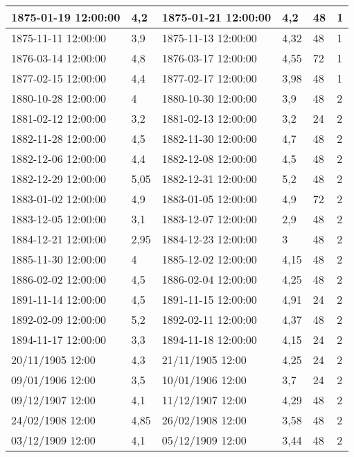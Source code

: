 \begin{longtable}{|p{3cm}|p{2.1cm}|p{3cm}|p{2cm}|l|l|}
        1875-01-19 12:00:00 & 4,2 & 1875-01-21 12:00:00 & 4,2 & 48 & 1 \\ \hline
        1875-11-11 12:00:00 & 3,9 & 1875-11-13 12:00:00 & 4,32 & 48 & 1 \\ \hline
        1876-03-14 12:00:00 & 4,8 & 1876-03-17 12:00:00 & 4,55 & 72 & 1 \\ \hline
        1877-02-15 12:00:00 & 4,4 & 1877-02-17 12:00:00 & 3,98 & 48 & 1 \\ \hline
        1880-10-28 12:00:00 & 4 & 1880-10-30 12:00:00 & 3,9 & 48 & 2 \\ \hline
        1881-02-12 12:00:00 & 3,2 & 1881-02-13 12:00:00 & 3,2 & 24 & 2 \\ \hline
        1882-11-28 12:00:00 & 4,5 & 1882-11-30 12:00:00 & 4,7 & 48 & 2 \\ \hline
        1882-12-06 12:00:00 & 4,4 & 1882-12-08 12:00:00 & 4,5 & 48 & 2 \\ \hline
        1882-12-29 12:00:00 & 5,05 & 1882-12-31 12:00:00 & 5,2 & 48 & 2 \\ \hline
        1883-01-02 12:00:00 & 4,9 & 1883-01-05 12:00:00 & 4,9 & 72 & 2 \\ \hline
        1883-12-05 12:00:00 & 3,1 & 1883-12-07 12:00:00 & 2,9 & 48 & 2 \\ \hline
        1884-12-21 12:00:00 & 2,95 & 1884-12-23 12:00:00 & 3 & 48 & 2 \\ \hline
        1885-11-30 12:00:00 & 4 & 1885-12-02 12:00:00 & 4,15 & 48 & 2 \\ \hline
        1886-02-02 12:00:00 & 4,5 & 1886-02-04 12:00:00 & 4,25 & 48 & 2 \\ \hline
        1891-11-14 12:00:00 & 4,5 & 1891-11-15 12:00:00 & 4,91 & 24 & 2 \\ \hline
        1892-02-09 12:00:00 & 5,2 & 1892-02-11 12:00:00 & 4,37 & 48 & 2 \\ \hline
        1894-11-17 12:00:00 & 3,3 & 1894-11-18 12:00:00 & 4,15 & 24 & 2 \\ \hline
        20/11/1905 12:00 & 4,3 & 21/11/1905 12:00 & 4,25 & 24 & 2 \\ \hline
        09/01/1906 12:00 & 3,5 & 10/01/1906 12:00 & 3,7 & 24 & 2 \\ \hline
        09/12/1907 12:00 & 4,1 & 11/12/1907 12:00 & 4,29 & 48 & 2 \\ \hline
        24/02/1908 12:00 & 4,85 & 26/02/1908 12:00 & 3,58 & 48 & 2 \\ \hline
        03/12/1909 12:00 & 4,1 & 05/12/1909 12:00 & 3,44 & 48 & 2 \\ \hline

\end{longtable}
